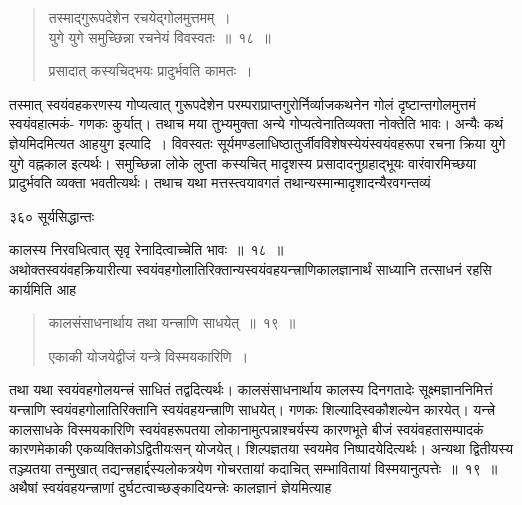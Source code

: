 \documentclass[11pt, openany]{book}
\begin{document}

\begin{quote}
{\ssi तस्माद्गुरूपदेशेन रचयेद्गोलमुत्तमम्~।\\
युगे युगे समुच्छिन्ना रचनेयं विवस्वतः~॥~१८~॥ 

प्रसादात् कस्यचिद्भयः प्रादुर्भवति कामतः~। }
\end{quote}
 तस्मात् स्वयंवहकरणस्य गोप्यत्वात् गुरूपदेशेन परम्पराप्राप्तगुरोर्निर्व्याजकथनेन गोलं दृष्टान्तगोलमुत्तमं स्वयंवहात्मकं- गणकः कुर्यात्। तथाच मया तुभ्यमुक्ता अन्ये गोप्यत्वेनातिव्यक्ता नोक्तेति भावः। अन्यैः कथं ज्ञेयमिदमित्यत आह\textendash युग इत्यादि~। विवस्वतः सूर्यमण्डलाधिष्ठातुर्जीवविशेषस्येयंस्वयंवहरूपा रचना क्रिया युगे युगे वह्नकाल इत्यर्थः। समुच्छिन्ना लोके लुप्ता कस्यचित् मादृशस्य प्रसादादनुग्रहाद्भूयः वारंवारमिच्छया प्रादुर्भवति व्यक्ता भवतीत्यर्थः। तथाच यथा मत्तस्त्वयावगतं तथान्यस्मान्मादृशादन्यैरवगन्तव्यं \textendash



\newpage


\noindent ३६० \hspace{4cm} सूर्यसिद्धान्तः
\vspace{1cm}


\noindent कालस्य निरवधित्वात् सृवृ रेनादित्वाच्चेति भावः~॥~१८~॥ \\
\noindent अथोक्तस्वयंवहक्रियारीत्या स्वयंवहगोलातिरिक्तान्यस्वयंवहयन्त्त्राणिकालज्ञानार्थं साध्यानि तत्साधनं रहसि कार्यमिति आह \textendash


 \begin{quote}
{\ssi कालसंसाधनार्थाय तथा यन्त्त्राणि साधयेत्~॥~१९~॥
 
एकाकी योजयेद्वीजं यन्त्रे विस्मयकारिणि~। }
\end{quote}
 तथा यथा स्वयंवहगोलयन्त्त्रं साधितं तद्वदित्यर्थः। कालसंसाधनार्थाय कालस्य दिनगतादेः सूक्ष्मज्ञाननिमित्तं यन्त्त्राणि स्वयंवहगोलातिरिक्तानि स्वयंवहयन्त्त्राणि साधयेत्। गणकः शिल्यादिस्वकौशल्येन कारयेत्। यन्त्त्रे कालसाधके विस्मयकारिणि स्वयंवहरूपतया लोकानामुत्पन्नाश्चर्यस्य कारणभूते बीजं स्वयंवहतासम्पादकं कारणमेकाकी एकव्यक्तिकोऽद्वितीयःसन् योजयेत्। शिल्पज्ञतया स्वयमेव निष्पादयेदित्यर्थः। अन्यथा द्वितीयस्य तञ्ज्यतया तन्मुखात् तद्यन्त्त्रहार्द्दस्यलोकत्रयेण गोचरतायां कदाचित् सम्भावितायां विस्मयानुत्पत्तेः~॥~१९~॥ \\
\noindent अथैषां स्वयंवहयन्त्त्राणां दुर्घटत्वाच्छङ्कादियन्त्त्रेः कालज्ञानं ज्ञेयमित्याह \textendash
\end{document}
